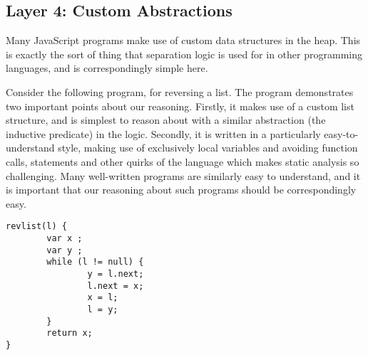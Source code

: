 \documentclass{article}
\newcommand{\iflong}[1]{#1}
\begin{document}
\iflong{\subsection{Layer 4: Custom Abstractions}

Many JavaScript programs make use of custom data structures in the heap. This
is exactly the sort of thing that separation logic is used for in other
programming languages, and is correspondingly simple here.

Consider the following program, for reversing a list. The program demonstrates
two important points about our reasoning. Firstly, it makes use of a custom
list structure, and is simplest to reason about with a similar abstraction (the
\tlist inductive predicate) in the logic. Secondly, it is written in a
particularly easy-to-understand style, making use of exclusively local
variables and avoiding function calls, \js{with} statements and other quirks of
the language which makes static analysis so challenging. Many well-written
programs are similarly easy to understand, and it is important that our
reasoning about such programs should be correspondingly easy.\\}
\begin{verbatim}revlist(l) {
        var x ;
        var y ;
        while (l != null) {
                y = l.next;
                l.next = x;
                x = l;
                l = y;
        }
        return x;
}
\end{verbatim}
\end{document}
